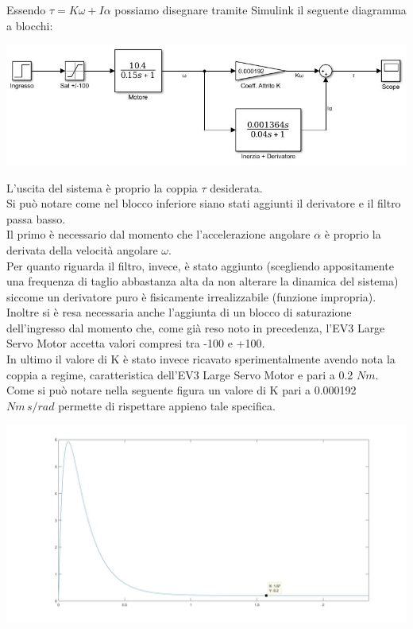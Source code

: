 Essendo $\tau=K\omega+I\alpha$ possiamo disegnare tramite Simulink il seguente diagramma a blocchi:
\begin{center}
	\includegraphics[width=\textwidth]{modMotoreTorque.jpg}
\end{center}
L'uscita del sistema è proprio la coppia $\tau$ desiderata.\\
Si può notare come nel blocco inferiore siano stati aggiunti il derivatore e il filtro passa basso.\\
Il primo è necessario dal momento che l'accelerazione angolare $\alpha$ è proprio la derivata della velocità angolare $\omega$.\\
Per quanto riguarda il filtro, invece, è stato aggiunto (scegliendo appositamente una frequenza di taglio abbastanza alta da non alterare la dinamica del sistema) siccome un derivatore puro è fisicamente irrealizzabile (funzione impropria).\\
Inoltre si è resa necessaria anche l'aggiunta di un blocco di saturazione dell'ingresso dal momento che, come già reso noto in precedenza, l'EV3 Large Servo Motor accetta valori compresi tra -100 e +100.\\
In ultimo il valore di K è stato invece ricavato sperimentalmente avendo nota la coppia a regime, caratteristica dell'EV3 Large Servo Motor e pari a 0.2 $Nm$.\\
Come si può notare nella seguente figura un valore di K pari a 0.000192 $Nm\,s/rad$ permette di rispettare appieno tale specifica.
\begin{center}
	\includegraphics[width=\textwidth]{torque02.jpg}
\end{center}
